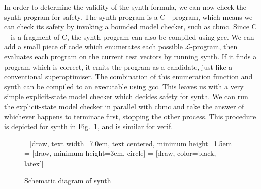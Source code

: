 \documentclass[a4paper]{llncs}
\newcommand{\newC}{C$^-$\xspace}
\begin{document}
In order to determine the validity of the {\sc synth} formula, we can now
check the {\sc synth} program for safety.  The {\sc synth} program is a
\newC program, which means we can check its safety by invoking a bounded
model checker, such as {\sc cbmc}.  Since \newC is a fragment of C,
the {\sc synth} program can also be compiled using {\sc gcc}.
We can add a small piece of code which enumerates each possible
$\mathcal{L}$-program, then evaluates each program on the current test vectors by
running {\sc synth}. If it finds a program which is correct, it emits
the program as a candidate, just like a conventional superoptimiser.
The combination of this enumeration function and {\sc synth} can be compiled
to an executable using {\sc gcc}.  This leaves
us with a very simple explicit-state model checker which decides
safety for {\sc synth}.  We can run the explicit-state model checker
in parallel with {\sc cbmc} and take the answer of whichever happens
to terminate first, stopping the other process.  This procedure is
depicted for {\sc synth} in Fig.~\ref{fig:synth-dfd}, and is similar for {\sc verif}.

\begin{figure}
\begin{center}
=[draw, text width=7.0em, text centered,
  minimum height=1.5em]
 = [draw, minimum height=3em, circle]
 = [draw, color=black, -latex']


\end{center}

\caption{Schematic diagram of {\sc synth}}
\label{fig:synth-dfd}
\end{figure}
\end{document}
